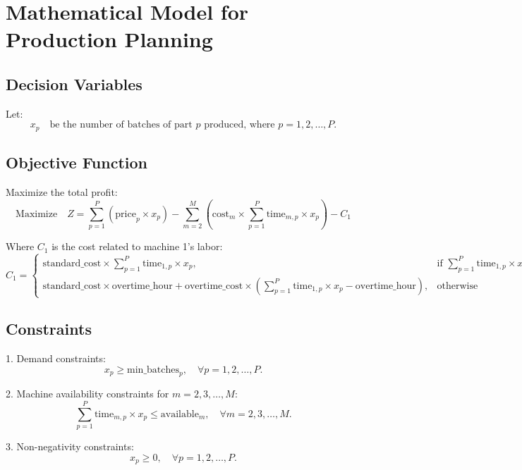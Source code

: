 \documentclass{article}
\begin{document}
\section*{Mathematical Model for Production Planning}

\subsection*{Decision Variables}
Let:
\[
x_p \quad \text{be the number of batches of part } p \text{ produced, where } p = 1, 2, \ldots, P.
\]

\subsection*{Objective Function}
Maximize the total profit:
\[
\text{Maximize} \quad Z = \sum_{p=1}^{P} \left( \text{price}_{p} \times x_p \right) - \sum_{m=2}^{M} \left( \text{cost}_{m} \times \sum_{p=1}^{P} \text{time}_{m,p} \times x_p \right) - C_1
\]

Where \( C_1 \) is the cost related to machine 1's labor:
\[
C_1 = \begin{cases}
\text{standard\_cost} \times \sum_{p=1}^{P} \text{time}_{1,p} \times x_p, & \text{if } \sum_{p=1}^{P} \text{time}_{1,p} \times x_p \leq \text{overtime\_hour} \\
\text{standard\_cost} \times \text{overtime\_hour} + \text{overtime\_cost} \times \left( \sum_{p=1}^{P} \text{time}_{1,p} \times x_p - \text{overtime\_hour} \right), & \text{otherwise}
\end{cases}
\]

\subsection*{Constraints}

1. Demand constraints:
\[
x_p \geq \text{min\_batches}_{p}, \quad \forall p = 1, 2, \ldots, P.
\]

2. Machine availability constraints for \( m = 2, 3, \ldots, M \):
\[
\sum_{p=1}^{P} \text{time}_{m,p} \times x_p \leq \text{available}_{m}, \quad \forall m = 2, 3, \ldots, M.
\]

3. Non-negativity constraints:
\[
x_p \geq 0, \quad \forall p = 1, 2, \ldots, P.
\]
\end{document}
